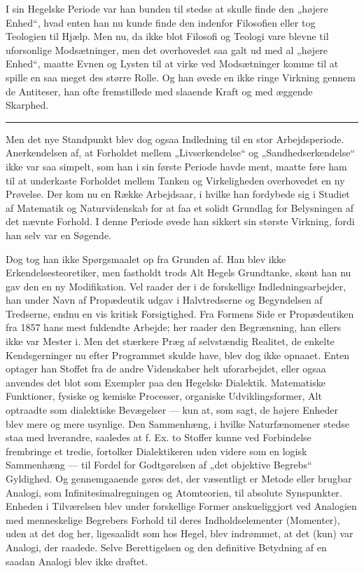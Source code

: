 \documentclass[12pt,a4paper,openany]{book}
\newcommand{\opage}[1]{\marginnote{\footnotesize\textit{[#1]}}}
\begin{document}
I sin Hegelske Periode var han bunden til stedse at skulle finde den „højere
Enhed“, hvad enten han nu kunde finde den indenfor Filosofien eller tog
Teologien til Hjælp. Men nu, da ikke blot Filosofi og Teologi vare blevne til
uforsonlige Modsætninger, men det overhovedet saa galt ud med al „højere
Enhed“, maatte Evnen og Lysten til at virke ved Modsætninger komme til at
spille en saa meget des større Rolle. Og han øvede en ikke ringe Virkning
gennem de Antiteser, han ofte fremstillede med slaaende Kraft og med æggende
Skarphed.

\begin{center}\rule{2cm}{0.4pt}\end{center}

Men det nye Standpunkt blev dog ogsaa Indledning til en stor Arbejdsperiode.
Anerkendelsen af, at Forholdet mellem „Livserkendelse“ og „Sandhedserkendelse“
ikke var saa simpelt, som han i sin første Periode havde ment, maatte føre ham
til at underkaste Forholdet mellem Tanken og Virkeligheden overhovedet en ny
Prøvelse. Der kom nu en Række Arbejdsaar, i hvilke han fordybede sig i Studiet
af Matematik og Naturvidenskab for at faa et solidt Grundlag for Belysningen af
det nævnte Forhold. I denne Periode øvede han sikkert sin største Virkning,
fordi han selv var en Søgende.

Dog tog han ikke Spørgsmaalet op fra Grunden af. Han blev ikke
Erkendelsesteoretiker, men fastholdt trods Alt Hegels Grundtanke, skønt han nu
gav den en ny Modifikation. Vel raader der i de forskellige
Indledningsarbejder, han under Navn af Propædeutik udgav i Halvtredserne og
Begyndelsen af Tredserne, endnu en vis kritisk Forsigtighed. Fra Formens Side
er Propædeutiken fra 1857 hans mest fuldendte Arbejde; her raader den
Begrænsning, han ellers ikke var Mester i. Men det stærkere Præg af selvstændig
Realitet,
\setcounter{footnote}{0}%
\opage{189}de enkelte Kendsgerninger nu efter Programmet skulde have, blev dog
ikke opnaaet. Enten optager han Stoffet fra de andre Videnskaber helt
uforarbejdet, eller ogsaa anvendes det blot som Exempler paa den Hegelske
Dialektik. Matematiske Funktioner, fysiske og kemiske Processer, organiske
Udviklingsformer, Alt optraadte som dialektiske Bevægelser --- kun at, som
sagt, de højere Enheder blev mere og mere usynlige. Den Sammenhæng, i hvilke
Naturfænomener stedse staa med hverandre, saaledes at f. Ex. to Stoffer kunne
ved Forbindelse frembringe et tredie, fortolker Dialektikeren uden videre som
en logisk Sammenhæng --- til Fordel for Godtgørelsen af „det objektive Begrebs“
Gyldighed. Og gennemgaaende gøres det, der væsentligt er Metode eller brugbar
Analogi, som Infinitesimalregningen og Atomteorien, til absolute Synspunkter.
Enheden i Tilværelsen blev under forskellige Former anskueliggjort ved
Analogien med menneskelige Begrebers Forhold til deres Indholdselementer
(Momenter), uden at det dog her, ligesaalidt som hos Hegel, blev indrømmet, at
det (kun) var Analogi, der raadede. Selve Berettigelsen og den definitive
Betydning af en saadan Analogi blev ikke drøftet.
\end{document}

